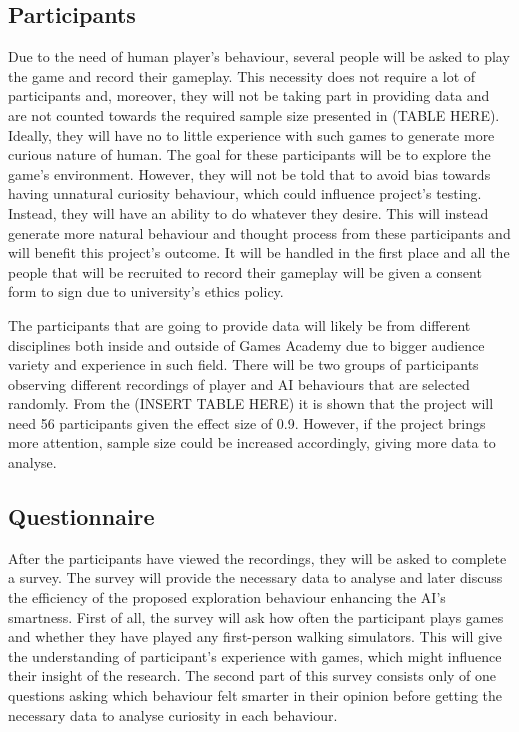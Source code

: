 \documentclass[journal]{IEEEtran}
\begin{document}
\subsection{Participants}
Due to the need of human player's behaviour, several people will be asked to play the game and record their gameplay. This necessity does not require a lot of participants and, moreover, they will not be taking part in providing data and are not counted towards the required sample size presented in (TABLE HERE). Ideally, they will have no to little experience with such games to generate more curious nature of human. The goal for these participants will be to explore the game's environment. However, they will not be told that to avoid bias towards having unnatural curiosity behaviour, which could influence project's testing. Instead, they will have an ability to do whatever they desire. This will instead generate more natural behaviour and thought process from these participants and will benefit this project's outcome. It will be handled in the first place and all the people that will be recruited to record their gameplay will be given a consent form to sign due to university's ethics policy. 

The participants that are going to provide data will likely be from different disciplines both inside and outside of Games Academy due to bigger audience variety and experience in such field. There will be two groups of participants observing different recordings of player and AI behaviours that are selected randomly. From the (INSERT TABLE HERE) it is shown that the project will need 56 participants given the effect size of 0.9. However, if the project brings more attention, sample size could be increased accordingly, giving more data to analyse.

\subsection{Questionnaire}
After the participants have viewed the recordings, they will be asked to complete a survey. The survey will provide the necessary data to analyse and later discuss the efficiency of the proposed exploration behaviour enhancing the AI's smartness. First of all, the survey will ask how often the participant plays games and whether they have played any first-person walking simulators. This will give the understanding of participant's experience with games, which might influence their insight of the research. The second part of this survey consists only of one questions asking which behaviour felt smarter in their opinion before getting the necessary data to analyse curiosity in each behaviour.
\end{document}
